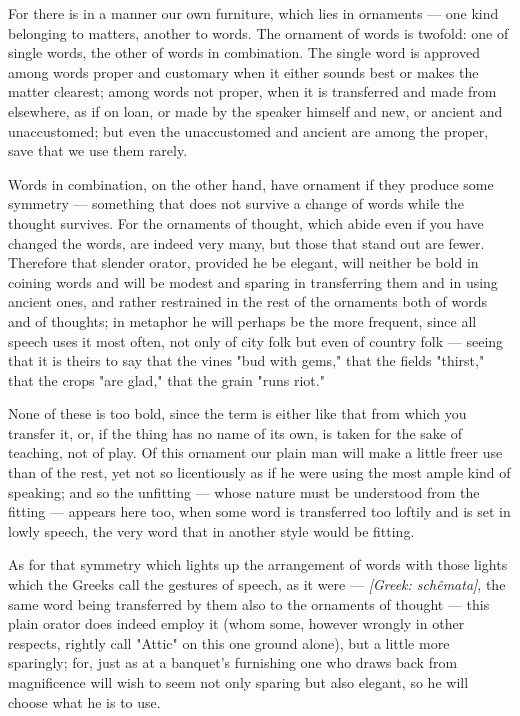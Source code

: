  For there is in a manner our own furniture, which lies in ornaments — one kind belonging to matters, another to words. The ornament of words is twofold: one of single words, the other of words in combination. The single word is approved among words proper and customary when it either sounds best or makes the matter clearest; among words not proper, when it is transferred and made from elsewhere, as if on loan, or made by the speaker himself and new, or ancient and unaccustomed; but even the unaccustomed and ancient are among the proper, save that we use them rarely.

 Words in combination, on the other hand, have ornament if they produce some symmetry — something that does not survive a change of words while the thought survives. For the ornaments of thought, which abide even if you have changed the words, are indeed very many, but those that stand out are fewer. Therefore that slender orator, provided he be elegant, will neither be bold in coining words and will be modest and sparing in transferring them and in using ancient ones, and rather restrained in the rest of the ornaments both of words and of thoughts; in metaphor he will perhaps be the more frequent, since all speech uses it most often, not only of city folk but even of country folk — seeing that it is theirs to say that the vines "bud with gems," that the fields "thirst," that the crops "are glad," that the grain "runs riot."

 None of these is too bold, since the term is either like that from which you transfer it, or, if the thing has no name of its own, is taken for the sake of teaching, not of play. Of this ornament our plain man will make a little freer use than of the rest, yet not so licentiously as if he were using the most ample kind of speaking; and so the unfitting — whose nature must be understood from the fitting — appears here too, when some word is transferred too loftily and is set in lowly speech, the very word that in another style would be fitting.

 As for that symmetry which lights up the arrangement of words with those lights which the Greeks call the gestures of speech, as it were — \textit{[Greek: schêmata]}, the same word being transferred by them also to the ornaments of thought — this plain orator does indeed employ it (whom some, however wrongly in other respects, rightly call "Attic" on this one ground alone), but a little more sparingly; for, just as at a banquet's furnishing one who draws back from magnificence will wish to seem not only sparing but also elegant, so he will choose what he is to use.

